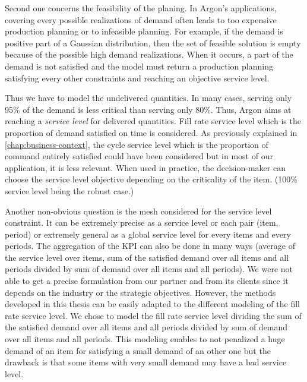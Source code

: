 Second one concerns the feasibility of the planing.
In Argon's applications, covering every possible realizations of demand often leads to too expensive production planning or to infeasible planning.
For example, if the demand is positive part of a Gaussian distribution, then the set of feasible solution is empty  because of the possible high demand realizations.
When it occurs, a part of the demand is not satisfied and the model must return a production planning satisfying every other constraints and reaching an objective service level.


Thus we have to model the undelivered quantities.
In many cases, serving only 95\% of the demand is less critical than serving only 80\%.
Thus, Argon aims at reaching a \emph{service level} for delivered quantities.
Fill rate service level which is the proportion of demand satisfied on time is considered.
As previously explained in \cref{chap:business-context}, the cycle service level which is the proportion of command entirely satisfied could have been considered but in most of our application, it is less relevant.
When used in practice, the decision-maker can choose the service level objective depending on the criticality of the item.
(100\% service level being the robust case.)


Another non-obvious question is the mesh considered for the service level constraint.
It can be extremely precise as a service level or each pair (item, period) or extremely general as a global service level for every items and every periods.
The aggregation of the KPI can also be done in many ways (\eg average of the service level over items, sum of the satisfied demand over all items and all periods divided by sum of demand over all items and all periods).
We were not able to get a precise formulation from our partner and from its clients since it depends on the industry or the strategic objectives.
However, the methods developed in this thesis can be easily adapted to the different modeling of the fill rate service level.
We chose to model the fill rate service level dividing the sum of the satisfied demand over all items and all periods divided by sum of demand over all items and all periods.
This modeling enables to not penalized a huge demand of an item for satisfying a small demand of an other one but the drawback is that some items with very small demand may have a bad service level.

